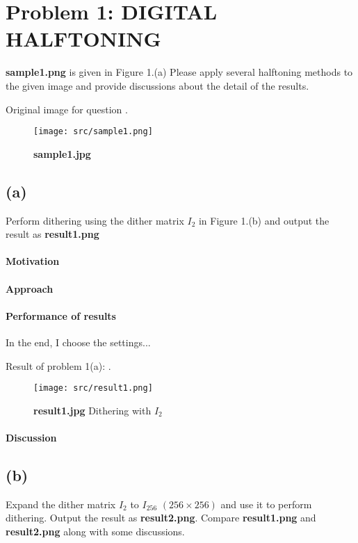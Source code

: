 \section{Problem 1: DIGITAL HALFTONING}\label{problem-1-digital-halftoning}
\textbf{sample1.png} is given in Figure 1.(a) Please apply several halftoning methods to the given image and provide discussions about the detail of the results.

Original image  for question .
\begin{figure}
    \centering
    \texttt{[image: src/sample1.png]}
    \caption{\textbf{sample1.jpg}}
    \label{sample1}
\end{figure}

\subsection{(a)}\label{1_a}
Perform dithering using the dither matrix \(I_{2}\) in Figure 1.(b) and output the result as \textbf{result1.png}

\paragraph{Motivation}

\paragraph{Approach}

\paragraph{Performance of results}
In the end, I choose the \alert{settings}...

Result of problem 1(a): .
\begin{figure}
    \centering
    \texttt{[image: src/result1.png]}
    \caption{\textbf{result1.jpg} Dithering with \(I_{2}\)}
    \label{result1}
\end{figure}

\paragraph{Discussion}

\subsection{(b)}\label{1_b}
Expand the dither matrix \(I_{2}\) to \(I_{256}\) \((256 \times 256)\) and use it to perform dithering. Output the result as \textbf{result2.png}. Compare \textbf{result1.png} and \textbf{result2.png} along with some discussions.

